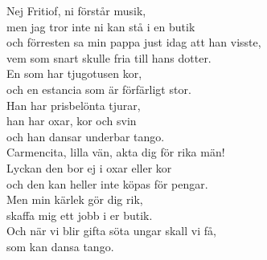 \documentclass[a6paper, 10pt, twoside]{article}
\begin{document}
\begin{lyrics}
\newpage
\noindent
Nej Fritiof, ni förstår musik, \\
men jag tror inte ni kan stå i en butik \\
och förresten sa min pappa just idag att han visste, \\
vem som snart skulle fria till hans dotter. \\
En som har tjugotusen kor, \\
och en estancia som är förfärligt stor. \\
Han har prisbelönta tjurar, \\
han har oxar, kor och svin \\
och han dansar underbar tango. 
\vspace{5pt}\\
Carmencita, lilla vän, akta dig för rika män! \\
Lyckan den bor ej i oxar eller kor \\
och den kan heller inte köpas för pengar. \\
Men min kärlek gör dig rik, \\
skaffa mig ett jobb i er butik. \\
Och när vi blir gifta söta ungar skall vi få, \\
som kan dansa tango.
\end{lyrics}
	    
\end{document}
